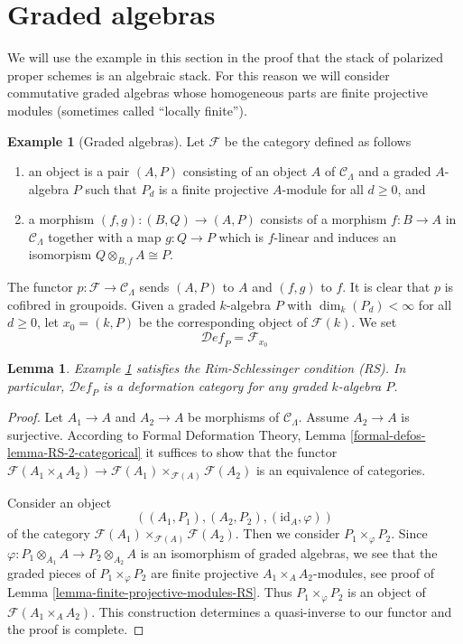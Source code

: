 \documentclass{stacks-project}
\theoremstyle{plain}
\newtheorem{lemma}[subsection]{Lemma}
\theoremstyle{definition}
\newtheorem{example}[subsection]{Example}
\theoremstyle{remark}
\numberwithin{equation}{subsection}
\def\Deformationcategory{\mathcal{D}\!\mathit{ef}}
\begin{document}
\section{Graded algebras}
\label{section-graded-algebras}

\noindent
We will use the example in this section in the proof that the stack of
polarized proper schemes is an algebraic stack. For this reason we will
consider commutative graded algebras whose homogeneous parts are
finite projective modules (sometimes called ``locally finite'').

\begin{example}[Graded algebras]
\label{example-graded-algebras}
Let $\mathcal{F}$ be the category defined as follows
\begin{enumerate}
\item an object is a pair $(A, P)$ consisting of an
object $A$ of $\mathcal{C}_\Lambda$ and a graded $A$-algebra $P$
such that $P_d$ is a finite projective $A$-module for all $d \geq 0$, and
\item a morphism $(f, g) : (B, Q) \to (A, P)$ consists of
a morphism $f : B \to A$ in $\mathcal{C}_\Lambda$ together
with a map $g : Q \to P$ which is $f$-linear and induces an
isomorpism $Q \otimes_{B, f} A \cong P$.
\end{enumerate}
The functor $p : \mathcal{F} \to \mathcal{C}_\Lambda$ sends $(A, P)$
to $A$ and $(f, g)$ to $f$. It is clear that $p$ is cofibred in groupoids.
Given a graded $k$-algebra $P$ with $\dim_k(P_d) < \infty$ for all
$d \geq 0$, let $x_0 = (k, P)$ be the corresponding object of $\mathcal{F}(k)$.
We set
$$
\Deformationcategory_P = \mathcal{F}_{x_0}
$$
\end{example}

\begin{lemma}
\label{lemma-graded-algebras-RS}
Example \ref{example-graded-algebras}
satisfies the Rim-Schlessinger condition (RS).
In particular, $\Deformationcategory_P$ is a deformation category
for any graded $k$-algebra $P$.
\end{lemma}

\begin{proof}
Let $A_1 \to A$ and $A_2 \to A$ be morphisms of $\mathcal{C}_\Lambda$.
Assume $A_2 \to A$ is surjective. According to
Formal Deformation Theory, Lemma
\ref{formal-defos-lemma-RS-2-categorical}
it suffices to show that the functor
$\mathcal{F}(A_1 \times_A A_2) \to
\mathcal{F}(A_1) \times_{\mathcal{F}(A)} \mathcal{F}(A_2)$
is an equivalence of categories.

\medskip\noindent
Consider an object
$$
((A_1, P_1), (A_2, P_2), (\text{id}_A, \varphi))
$$
of the category $\mathcal{F}(A_1) \times_{\mathcal{F}(A)} \mathcal{F}(A_2)$.
Then we consider $P_1 \times_\varphi P_2$. Since
$\varphi : P_1 \otimes_{A_1} A \to P_2 \otimes_{A_2} A$
is an isomorphism of graded algebras, we see that the graded pieces
of $P_1 \times_\varphi P_2$ are finite projective $A_1 \times_A A_2$-modules,
see proof of Lemma \ref{lemma-finite-projective-modules-RS}.
Thus $P_1 \times_\varphi P_2$ is an object of $\mathcal{F}(A_1 \times_A A_2)$.
This construction determines a quasi-inverse to our functor
and the proof is complete.
\end{proof}
\end{document}
